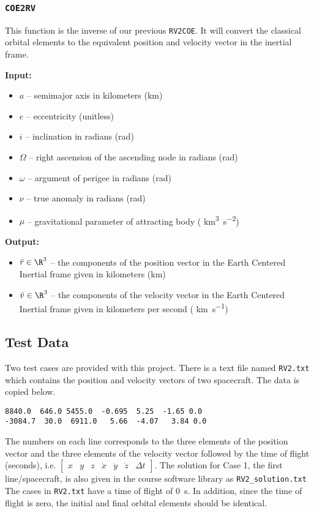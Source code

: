 \documentclass[11pt, reqno]{article}    %
\begin{document}
\subsubsection*{\texttt{COE2RV}}

This function is the inverse of our previous \texttt{RV2COE}.
It will convert the classical orbital elements to the equivalent position and velocity vector in the inertial frame.

\noindent\textbf{Input:}
\begin{itemize}
    \item \( a \)  -- semimajor axis in kilometers (\si{\kilo\meter})
    \item \( e \) -- eccentricity (unitless)
    \item \( i \) -- inclination in radians (\si{\radian})
    \item \( \Omega \) -- right ascension of the ascending node in radians (\si{\radian})
    \item \( \omega \) -- argument of perigee in radians (\si{\radian})
    \item \( \nu \) -- true anomaly in radians (\si{\radian})
    \item \( \mu \) -- gravitational parameter of attracting body ( \si{\kilo\meter\cubed\per\second\squared})
\end{itemize}

\noindent\textbf{Output:}
\begin{itemize}
    \item \( \bar r \in \R^{3} \) -- the components of the position vector in the Earth Centered Inertial frame given in kilometers (\si{\kilo\meter})
    \item \( \bar v \in \R^{3} \) -- the components of the velocity vector in the Earth Centered Inertial frame given in kilometers per second ( \si{\kilo\meter\per\second})
\end{itemize}

\subsection*{Test Data}
Two test cases are provided with this project. 
There is a text file named \texttt{RV2.txt} which contains the position and velocity vectors of two spacecraft. 
The data is copied below.
\begin{verbatim}
8840.0  646.0 5455.0  -0.695  5.25  -1.65 0.0
-3084.7  30.0  6911.0   5.66  -4.07   3.84 0.0
\end{verbatim}
The numbers on each line corresponds to the three elements of the position vector and the three elements of the velocity vector followed by the time of flight (seconds), i.e. \(\begin{bmatrix} x & y & z & \dot{x} & \dot{y} & \dot{z} & \Delta t \end{bmatrix}\).
The solution for Case 1, the first line/spacecraft, is also given in the course software library as \texttt{RV2\_solution.txt}
The cases in \texttt{RV2.txt} have a time of flight of \SI{0}{\second}.
In addition, since the time of flight is zero, the initial and final orbital elements should be identical.
\end{document}
